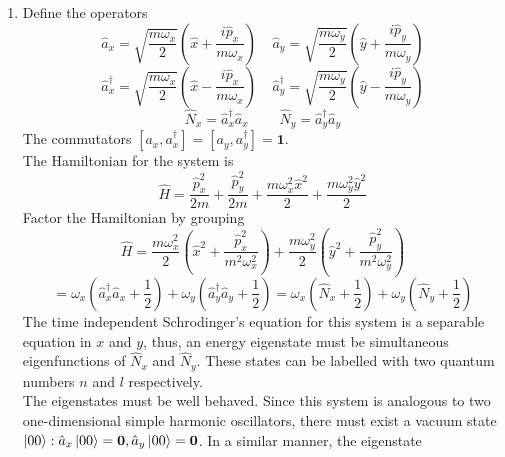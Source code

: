 \begin{sol}
\begin{enumerate}[label=\textbf{(\alph*)}]
\item
Define the operators
\begin{equation}
	\hat a_x=\sqrt{\frac{m\omega_x}{2}}\left(\hat x+\frac{i\hat p_x}{m\omega_x}\right)\:\:\:\:\:\hat a_y=\sqrt{\frac{m\omega_y}{2}}\left(\hat y+\frac{i\hat p_y}{m\omega_y}\right)
\end{equation} 
\begin{equation}
	\hat a_x^\dagger=\sqrt{\frac{m\omega_x}{2}}\left(\hat x-\frac{i\hat p_x}{m\omega_x}\right)\:\:\:\:\:\hat a_y^\dagger=\sqrt{\frac{m\omega_y}{2}}\left(\hat y-\frac{i\hat p_y}{m\omega_y}\right)
\end{equation} 
\begin{equation}
	\hat N_x=\hat a_x^\dagger\hat a_x\:\:\:\:\:\:\:\:\:\:\hat N_y=\hat a_y^\dagger\hat a_y
\end{equation} 
The commutators $[a_x,a_x^\dagger]=[a_y,a_y^\dagger]=\mathbf 1$.\\
The Hamiltonian for the system is 
\begin{equation}
	\hat H=\frac{\hat p_x^2}{2m}+\frac{\hat p_y^2}{2m}+\frac{m\omega_x^2\hat x^2}{2}+\frac{m\omega_y^2\hat y^2}{2}
\end{equation}
Factor the Hamiltonian by grouping
\begin{equation}
	\hat H=\frac{m\omega_x^2}{2}\left(\hat x^2+\frac{\hat p_x^2}{m^2\omega_x^2}\right)+\frac{m\omega_y^2}{2}\left(\hat y^2+\frac{\hat p_y^2}{m^2\omega_y^2}\right)
\end{equation}
\begin{equation}
	=\omega_x\left(\hat a_x^\dagger\hat a_x+\frac{1}{2}\right)+\omega_y\left(\hat a_y^\dagger\hat a_y+\frac{1}{2}\right)=\omega_x\left(\hat N_x+\frac{1}{2}\right)+\omega_y\left(\hat N_y+\frac{1}{2}\right)
\end{equation} 
The time independent Schrodinger's equation for this system is a separable equation in $x$ and $y$, thus, an energy eigenstate must be simultaneous eigenfunctions of $\hat N_x$ and $\hat N_y$. These states can be labelled with two quantum numbers $n$ and $l$ respectively. \\
The eigenstates must be well behaved. Since this system is analogous to two one-dimensional simple harmonic oscillators, there must exist a vacuum state $\ket{00}:\hat a_x\ket{00}=\mathbf 0,\hat a_y\ket{00}=\mathbf 0$. In a similar manner, the eigenstate \begin{equation}

\end{equation}
\end{enumerate}
\end{sol}
